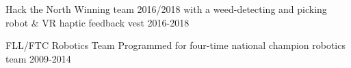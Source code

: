 


\begin{cvhonors}

\cvhonor
{Hack the North} %
{Winning team 2016/2018 with a weed-detecting and picking robot 
\& VR haptic feedback vest} %
{} %
{2016-2018} %

\cvhonor
{FLL/FTC Robotics Team} %
{Programmed for four-time national champion robotics team} %
{} %
{2009-2014} %


\end{cvhonors}
